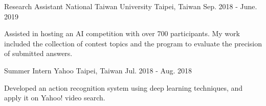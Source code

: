\begin{cventries}
  \cventry
    {Research Assistant} %
    {National Taiwan University} %
    {Taipei, Taiwan} %
    {Sep. 2018 - June. 2019} %
    {
      \begin{cvitems} %
        \item {Assisted in hosting an AI competition with over 700 participants. My work included the collection of contest topics and the program to evaluate the precision of submitted answers.}
      \end{cvitems}
    }

  \cventry
    {Summer Intern} %
    {Yahoo} %
    {Taipei, Taiwan} %
    {Jul. 2018 - Aug. 2018} %
    {
      \begin{cvitems} %
        \item {Developed an action recognition system using deep learning techniques, and apply it on Yahoo! video search.}
      \end{cvitems}
    }

\end{cventries}
